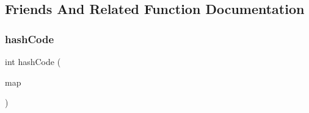 \subsection{Friends And Related Function Documentation}
\mbox{\label{classHashMap_a7d7deb2ac68a3cbb8c4a9744f17d71d6}} 
\subsubsection{\texorpdfstring{hash\+Code}{hashCode}}
{\footnotesize\ttfamily int hash\+Code (\begin{DoxyParamCaption}\item[{const \mbox{\hyperlink{classHashMap}{Hash\+Map}}$<$ K, V $>$ \&}]{map }\end{DoxyParamCaption})\hspace{0.3cm}{\ttfamily [friend]}}

